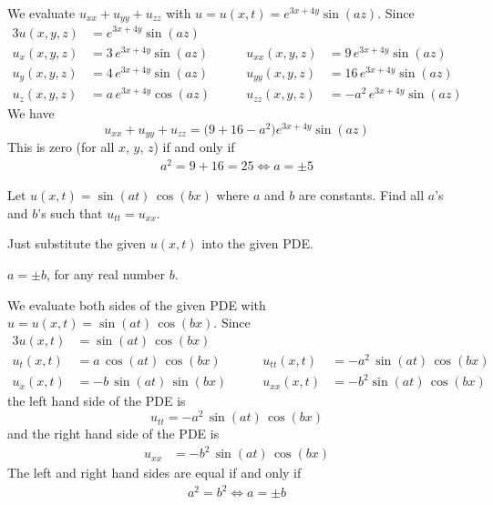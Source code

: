 \begin{solution}
We evaluate $u_{xx}+u_{yy}+u_{zz}$ with $u=u(x,t) =  e^{3x+4y}\sin(az)$.
Since
\begin{alignat*}{3}
u(x,y,z) &=  e^{3x+4y}\sin(az)\\
u_x(x,y,z) &=  3\,e^{3x+4y}\sin(az)\qquad &
u_{xx}(x,y,z) &=  9\,e^{3x+4y}\sin(az) \\
u_y(x,y,z) &=  4\,e^{3x+4y}\sin(az)\qquad &
u_{yy}(x,y,z) &=  16\,e^{3x+4y}\sin(az) \\
u_z(x,y,z) &=  a\,e^{3x+4y}\cos(az)\qquad &
u_{zz}(x,y,z) &=  -a^2\,e^{3x+4y}\sin(az) 
\end{alignat*}
We have 
\begin{equation*}
u_{xx}+u_{yy}+u_{zz} = \big(9+16-a^2) e^{3x+4y}\sin(az)
\end{equation*}
This is zero (for all $x$, $y$, $z$) if and only if
\begin{align*}
a^2=9+16=25 \iff a=\pm 5
\end{align*}
\end{solution}

\begin{question}
Let $u(x,t) = \sin(at)\,\cos(bx)$ where $a$ and $b$ are constants. Find all $a$'s and $b$'s such that $u_{tt} = u_{xx}$.
\end{question}

\begin{hint}
Just substitute the given $u(x,t)$ into the given PDE.
\end{hint}

\begin{answer}
$a=\pm b$, for any real number $b$. 
\end{answer}

\begin{solution}
We evaluate both sides of the given PDE with $u=u(x,t)=\sin(at)\,\cos(bx)$.
Since
\begin{alignat*}{3}
u(x,t) &=  \sin(at)\,\cos(bx) \\
u_t(x,t) &=  a\,\cos(at)\,\cos(bx) \qquad &
u_{tt}(x,t) &=  -a^2\,\sin(at)\,\cos(bx) \\
u_x(x,t) &= -b\,\sin(at)\,\sin(bx) \qquad &
u_{xx}(x,t) &=  -b^2\sin(at)\,\cos(bx)
\end{alignat*}
the left hand side of the PDE is
\begin{equation*}
u_{tt} = -a^2\,\sin(at)\,\cos(bx)
\end{equation*}
and the right hand side of the PDE is
\begin{align*}
u_{xx} 
&=-b^2\,\sin(at)\,\cos(bx)
\end{align*}
The left and right hand sides are equal if and only if
\begin{align*}
a^2=b^2 \iff a=\pm b
\end{align*}
\end{solution}


